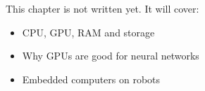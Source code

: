 \label{ch:hw1}
\begin{keyidea}
This chapter is not written yet. It will cover:
\begin{itemize}[nosep]
  \item CPU, GPU, RAM and storage
  \item Why GPUs are good for neural networks
  \item Embedded computers on robots
\end{itemize}
\end{keyidea}
